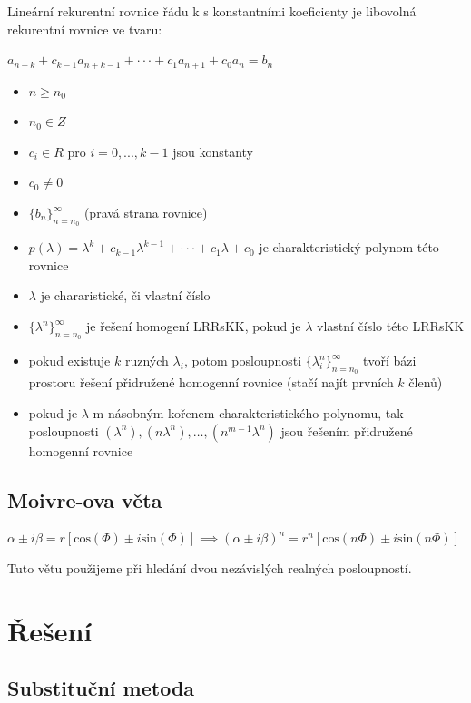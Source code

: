 \documentclass{szzclass}
\begin{document}
Lineární rekurentní rovnice řádu k s konstantními koeficienty je
libovolná rekurentní rovnice ve tvaru:

\begin{center}
$a_{n+k} + c_{k−1}a_{n+k−1} + · · · + c_1a_{n+1} + c_0a_n = b_n$
\end{center}

\begin{itemize}
    \item $n \geq n_0$
    \item $n_0 \in Z$
    \item $c_i \in R$ pro $i = 0, . . . , k − 1$ jsou konstanty
    \item $c_0 \neq 0$
    \item $\{b_n\}^\infty_{n = n_0}$ (pravá strana rovnice)
    \item $p(\lambda) = \lambda^k + c_{k−1}\lambda^{k−1} + · · · + c_1\lambda + c_0$ je charakteristický polynom této rovnice
    \item $\lambda$ je chararistické, či vlastní číslo
    \item $\{\lambda^n\}^\infty_{n = n_0}$ je řešení homogení LRRsKK, pokud je $\lambda$ vlastní číslo této LRRsKK
    \item pokud existuje $k$ ruzných $\lambda_i$, potom posloupnosti $\{\lambda^n_i\}^\infty_{n = n_0}$ tvoří bázi prostoru řešení přidružené homogenní rovnice (stačí najít prvních $k$ členů)
    \item pokud je $\lambda$ m-násobným kořenem charakteristického polynomu, tak posloupnosti $(\lambda^n), (n\lambda^n), \dots, (n^{m-1}\lambda^n)$ jsou řešením přidružené homogenní rovnice
\end{itemize}

\subsection{Moivre-ova věta}

$\alpha \pm i\beta = r[\text{cos}(\Phi) \pm i\text{sin}(\Phi)] \implies (\alpha \pm i\beta)^n = r^n[\text{cos}(n\Phi) \pm i\text{sin}(n\Phi)]$

Tuto větu použijeme při hledání dvou nezávislých realných posloupností.

\section{Řešení}

\subsection{Substituční metoda}
\end{document}
